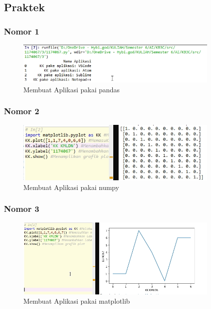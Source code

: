 \subsection{Praktek}
\subsubsection{Nomor 1}
\hfill\break

\begin{figure}[H]
\centerline{\includegraphics[width=10cm]{figures/1174067/3/4.jpg}}
\caption{Membuat Aplikasi pakai pandas}
\label{labelgambar}
\end{figure}

\subsubsection{Nomor 2}
\hfill\break

\begin{figure}[H]
\centerline{\includegraphics[width=10cm]{figures/1174067/3/5.jpg}}
\caption{Membuat Aplikasi pakai numpy}
\label{labelgambar}
\end{figure}

\subsubsection{Nomor 3}
\hfill\break

\begin{figure}[H]
\centerline{\includegraphics[width=10cm]{figures/1174067/3/6.jpg}}
\caption{Membuat Aplikasi pakai matplotlib}
\label{labelgambar}
\end{figure}

